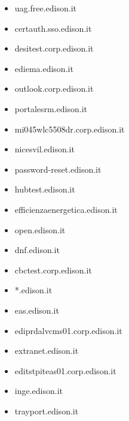 \documentclass{article}
\begin{document}
\begin{itemize}
            \item uag.free.edison.it
        
            \item certauth.sso.edison.it
        
            \item desitest.corp.edison.it
        
            \item ediema.edison.it
        
            \item outlook.corp.edison.it
        
            \item portalesrm.edison.it
        
            \item mi045wlc5508dr.corp.edison.it
        
            \item nicesvil.edison.it
        
            \item password-reset.edison.it
        
            \item hubtest.edison.it
        
            \item efficienzaenergetica.edison.it
        
            \item open.edison.it
        
            \item dnf.edison.it
        
            \item cbctest.corp.edison.it
        
            \item *.edison.it
        
            \item eas.edison.it
        
            \item ediprdalvcms01.corp.edison.it
        
            \item extranet.edison.it
        
            \item editstpiteas01.corp.edison.it
        
            \item inge.edison.it
        
            \item trayport.edison.it
        

\end{itemize}
\end{document}
